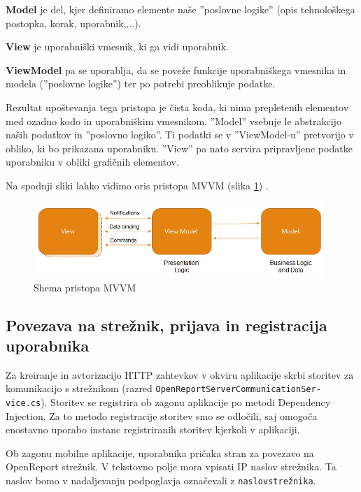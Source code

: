 \documentclass[a4paper, 12pt]{book}
\begin{document}
\textbf{Model} je del, kjer definiramo elemente naše ''poslovne logike'' (opis tehnološkega postopka, korak, uporabnik,...).

\textbf{View} je uporabniški vmesnik, ki ga vidi uporabnik.

\textbf{ViewModel} pa se uporablja, da se poveže funkcije uporabniškega vmesnika in modela (''poslovne logike'') ter po potrebi preoblikuje podatke.

Rezultat upoštevanja tega pristopa je čista koda, ki nima prepletenih elementov med ozadno kodo in uporabniškim vmesnikom.
''Model'' vsebuje le abstrakcijo naših podatkov in ''poslovno logiko''.
Ti podatki se v ''ViewModel-u'' pretvorijo v obliko, ki bo prikazana uporabniku.
''View'' pa nato servira pripravljene podatke uporabniku v obliki grafičnih elementov.

Na spodnji sliki lahko vidimo oris pristopa MVVM (slika \ref{mvvm}) \cite{mvvmimage}.

\begin{figure}[H]
\begin{center}
\includegraphics[width=11cm]{mvvm}
\end{center}
	\caption{Shema pristopa MVVM}
\label{mvvm}
\end{figure}

\subsection{Povezava na strežnik, prijava in registracija uporabnika}

Za kreiranje in avtorizacijo HTTP zahtevkov v okviru aplikacije skrbi storitev za komunikacijo s strežnikom (razred \texttt{OpenReportServerCommunicationSer-\\vice.cs}).
Storitev se registrira ob zagonu aplikacije po metodi Dependency Injection.
Za to metodo registracije storitev smo se odločili, saj omogoča enostavno uporabo instanc registriranih storitev kjerkoli v aplikaciji.

Ob zagonu mobilne aplikacije, uporabnika pričaka stran za povezavo na OpenReport strežnik.
V tekstovno polje mora vpisati IP naslov strežnika.
Ta naslov bomo v nadaljevanju podpoglavja označevali z \texttt{naslovstrežnika}.
\end{document}
